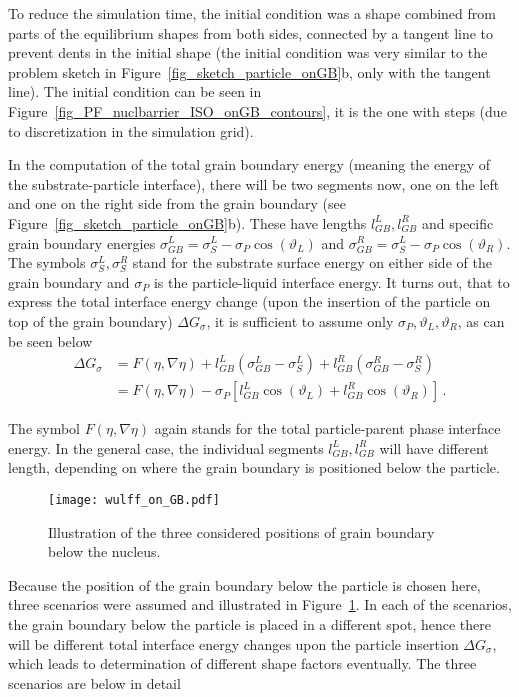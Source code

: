 To reduce the simulation time, the initial condition was a shape combined from parts of the equilibrium shapes from both sides, connected by a tangent line to prevent dents in the initial shape (the initial condition was very similar to the problem sketch in Figure~\ref{fig_sketch_particle_onGB}b, only with the tangent line). The initial condition can be seen in Figure~\ref{fig_PF_nuclbarrier_ISO_onGB_contours}, it is the one with steps (due to discretization in the simulation grid).

In the computation of the total grain boundary energy (meaning the energy of the substrate-particle interface), there will be two segments now, one on the left and one on the right side from the grain boundary (see Figure~\ref{fig_sketch_particle_onGB}b). These have lengths $l_{GB}^{L}, l_{GB}^{R}$ and specific grain boundary energies $\sigma_{GB}^L=\sigma_{S}^L-\sigma_P\cos(\vartheta_L)$ and $\sigma_{GB}^R=\sigma_{S}^L-\sigma_P\cos(\vartheta_R)$. The symbols $\sigma_{S}^L,\sigma_{S}^R$ stand for the substrate surface energy on either side of the grain boundary and $\sigma_{P}$ is the particle-liquid interface energy. It turns out, that to express the total interface energy change (upon the insertion of the particle on top of the grain boundary) $\Delta G_\sigma$, it is sufficient to assume only $\sigma_P,\vartheta_L,\vartheta_R$, as can be seen below
\begin{align}
	\Delta G_\sigma &= F(\eta,\nabla\eta) + l_{GB}^{L}(\sigma_{GB}^L-\sigma_{S}^L) + l_{GB}^{R}(\sigma_{GB}^R-\sigma_{S}^R) \\
	&= F(\eta,\nabla\eta) - \sigma_P[l_{GB}^{L}\cos(\vartheta_L) + l_{GB}^{R}\cos(\vartheta_R)] \,.
\end{align}

The symbol $F(\eta,\nabla\eta)$ again stands for the total particle-parent phase interface energy. In the general case, the individual segments $l_{GB}^{L}, l_{GB}^{R}$ will have different length, depending on where the grain boundary is positioned below the particle. 

\begin{figure}
	\centering
	\texttt{[image: wulff\_on\_GB.pdf]}
	\caption{Illustration of the three considered positions of grain boundary below the nucleus.}
	\label{fig_GB_below_wulff}
\end{figure}

Because the position of the grain boundary below the particle is chosen here, three scenarios were assumed and illustrated in Figure~\ref{fig_GB_below_wulff}. In each of the scenarios, the grain boundary below the particle is placed in a different spot, hence there will be different total interface energy changes upon the particle insertion $\Delta G_\sigma$, which leads to determination of different shape factors eventually. The three scenarios are below in detail

